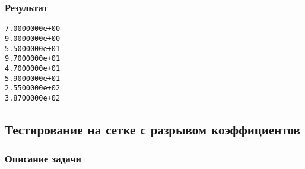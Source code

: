 \documentclass[12pt, a4paper]{article}
\begin{document}
\subsubsection{Результат}

\begin{verbatim}
7.0000000e+00
9.0000000e+00
5.5000000e+01
9.7000000e+01
4.7000000e+01
5.9000000e+01
2.5500000e+02
3.8700000e+02
\end{verbatim}

\subsection{Тестирование на сетке с разрывом коэффициентов}
\subsubsection{Описание задачи}
\end{document}
